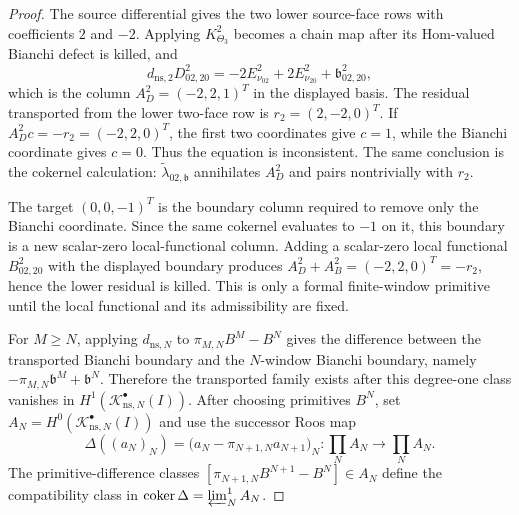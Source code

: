 \begin{proof}
  The source differential gives the two lower source-face rows with
  coefficients \(2\) and \(-2\).  Applying \(K^2_{\Theta_3}\) becomes a
  chain map after its Hom-valued Bianchi defect is killed, and
  \[
    d_{\mathrm{ns},2}D^2_{02,20}
      =
    -2E^2_{\nu_{02}}+2E^2_{\nu_{20}}
      +\mathfrak b^2_{02,20},
  \]
  which is the column \(A_D^2=(-2,2,1)^T\) in the displayed basis.  The
  residual transported from the lower two-face row is \(r_2=(2,-2,0)^T\).
  If \(A_D^2c=-r_2=(-2,2,0)^T\), the first two coordinates give
  \(c=1\), while the Bianchi coordinate gives \(c=0\).  Thus the equation
  is inconsistent.  The same conclusion is the cokernel calculation:
  \(\widetilde\lambda_{02,\mathfrak b}\) annihilates \(A_D^2\) and pairs
  nontrivially with \(r_2\).

  The target \((0,0,-1)^T\) is the boundary column required to remove
  only the Bianchi coordinate.  Since the same cokernel evaluates to
  \(-1\) on it, this boundary is a new scalar-zero local-functional
  column.
  Adding a scalar-zero local functional \(B^2_{02,20}\) with the displayed
  boundary produces
  \(A_D^2+A_B^2=(-2,2,0)^T=-r_2\), hence the lower residual is killed.
  This is only a formal finite-window primitive until the local functional
  and its admissibility are fixed.

  For \(M\ge N\), applying \(d_{\mathrm{ns},N}\) to
  \(\pi_{M,N}B^M-B^N\) gives the difference between the transported
  Bianchi boundary and the \(N\)-window Bianchi boundary, namely
  \(-\pi_{M,N}\mathfrak b^M+\mathfrak b^N\).  Therefore the transported
  family exists after this degree-one class vanishes in
  \(H^1(\mathcal K^\bullet_{\mathrm{ns},N}(I))\).  After choosing
  primitives \(B^N\), set
  \(A_N=H^0(\mathcal K^\bullet_{\mathrm{ns},N}(I))\) and use the
  successor Roos map
  \[
    \Delta((a_N)_N)
      =
      \bigl(a_N-\pi_{N+1,N}a_{N+1}\bigr)_N
      \colon \prod_N A_N\longrightarrow\prod_N A_N .
  \]
  The primitive-difference classes
  \([\pi_{N+1,N}B^{N+1}-B^N]\in A_N\) define the compatibility class in
  \(\operatorname{coker}\Delta=\varprojlim\nolimits^1_NA_N\).
\end{proof}

